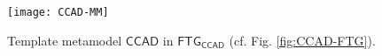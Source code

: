
\begin{figure}[t]
\centering
\texttt{[image: CCAD-MM]}
\caption{Template metamodel $\mathsf{CCAD}$ in $\mathsf{FTG_{CCAD}}$ 
(cf. Fig. \ref{fig:CCAD-FTG}).}
\label{fig:CCAD-MM}%
\end{figure}
